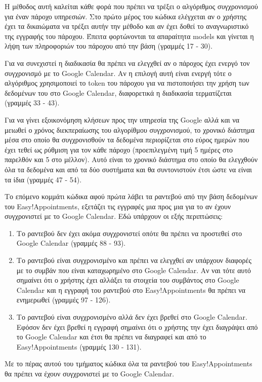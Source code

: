 

Η μέθοδος αυτή καλείται κάθε φορά που πρέπει να τρέξει ο αλγόριθμος συγχρονισμού για έναν πάροχο υπηρεσιών. Στο πρώτο μέρος του κώδικα ελέγχεται αν ο χρήστης έχει τα δικαιώματα να τρέξει αυτήν την μέθοδο και αν έχει δοθεί το αναγνωριστικό της εγγραφής του πάροχου. Έπειτα φορτώνονται τα απαραίτητα models και γίνεται η λήψη των πληροφοριών του πάροχου από την βάση (γραμμές 17 - 30). 

Για να συνεχιστεί η διαδικασία θα πρέπει να ελεγχθεί αν ο πάροχος έχει ενεργό τον συγχρονισμό με το Google Calendar. Αν η επιλογή αυτή είναι ενεργή τότε ο αλγόριθμος χρησιμοποιεί το token του πάροχου για να πιστοποιήσει την χρήση των δεδομένων του στο Google Calendar, διαφορετικά η διαδικασία τερματίζεται (γραμμές 33 - 43). 

Για να γίνει εξοικονόμηση κλήσεων προς την υπηρεσία της Google αλλά και να μειωθεί ο χρόνος διεκπεραίωσης του αλγορίθμου συγχρονισμού, το χρονικό διάστημα μέσα στο οποίο θα συγχρονισθούν τα δεδομένα περιορίζεται στο εύρος ημερών που έχει τεθεί ως ρύθμιση για τον κάθε πάροχο (προεπιλεγμένη τιμή 5 ημέρες στο παρελθόν και 5 στο μέλλον). Αυτό είναι το χρονικό διάστημα στο οποίο θα ελεγχθούν όλα τα δεδομένα και από τα δύο συστήματα και θα συντονιστούν έτσι ώστε να είναι τα ίδια (γραμμές 47 - 54).

Το επόμενο κομμάτι κώδικα αφού πρώτα λάβει τα ραντεβού από την βάση δεδομένων του Easy!Appointments, εξετάζει τις εγγραφές μια προς μια για το αν έχουν συγχρονιστεί με το Google Calendar. Εδώ υπάρχουν οι εξής περιπτώσεις:
\begin{enumerate}
\item Το ραντεβού δεν έχει ακόμα συγχρονιστεί οπότε θα πρέπει να προστεθεί στο Google Calendar (γραμμές 88 - 93).
\item Το ραντεβού είναι συγχρονισμένο και πρέπει να ελεγχθεί αν υπάρχουν διαφορές με το συμβάν που είναι καταχωρημένο στο Google Calendar. Αν ναι τότε αυτό σημαίνει ότι ο χρήστης έχει αλλάξει τα στοιχεία του συμβάντος στο Google Calendar και η εγγραφή του ραντεβού στο Easy!Appointments θα πρέπει να ενημερωθεί (γραμμές 97 - 126).
\item Το ραντεβού είναι συγχρονισμένο αλλά δεν έχει βρεθεί στο Google Calendar. Εφόσον δεν έχει βρεθεί η εγγραφή σημαίνει ότι ο χρήστης την έχει διαγράψει από το Google Calendar και έτσι θα πρέπει να διαγραφεί και από το Easy!Appointments (γραμμές 130 - 131).
\end{enumerate}
Με το πέρας αυτού του τμήματος κώδικα όλα τα ραντεβού του Easy!Appointments θα πρέπει να έχουν συγχρονιστεί με το Google Calendar.

